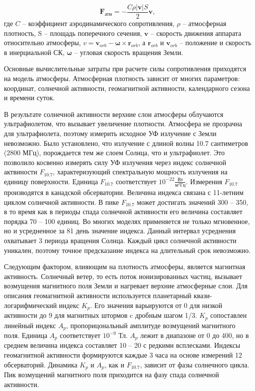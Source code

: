 \begin{equation*}
    \mathbf{F}_{\text{атм}} = - \frac{C \rho |\mathbf{v}| S}{2} \mathbf{v},
\end{equation*}
где $C$ -- коэффициент аэродинамического сопротивления, $\rho$ -- атмосферная плотность, 
S -- площадь поперечного сечения, 
$\mathbf{v}$ -- скорость движения аппарата относительно атмосферы, 
$v = \mathbf{v}_{orb} - \mathbf{\omega} \times \mathbf{r}_{orb}$, а
$\mathbf{r}_{orb}$ и $\mathbf{v}_{orb}$  -- положение и скорость в инерциальной СК,
$\mathbf{\omega}$ -- угловая скорость вращения Земли.

Основные вычислительные затраты при расчете силы сопротивления приходятся на модель атмосферы.
Атмосферная плотность зависит от многих параметров: координат, солнечной активности,
геомагнитной активности, календарного сезона и времени суток.

В результате солнечной активности верхние слои атмосферы облучаются ультрафиолетом,
что вызывает увеличение плотности. Атмосфера не прозрачна для ультрафиолета,
поэтому измерить исходное УФ излучение с Земли невозможно. Было установлено, что
излучение с длиной волны 10.7 сантиметров (2800 МГц), порождается тем же слоем Солнца, что и
ультрафиолет. Это позволило косвенно измерять силу УФ излучения через индекс
солнечной актвиности $F_{10.7}$, характеризующий спектральную мощность излучения на единицу поверхности. Единица $F_{10.7}$ соответствует
$10^{-22} \frac{\text{Вт}}{\text{м}^2 \text{Гц}}$. 
Измерения $F_{10.7}$ производятся в канадской обсерватории. 
Величина индекса связана с 11-летним циклом солнечной активности. 
В пике $F_{10.7}$ может достигать значений 300 -- 350, в то время как в периоды спада
солнечной активности его величина составляет порядка 70 -- 100 единиц. 
Во многих моделях применяется не только мгновенное, но и усредненное за 81 день значение индекса.
Данный интервал усреднения охватывает 3 периода вращения Солнца. 
Каждый цикл солнечной активности уникален, 
поэтому точное предсказание индекса на длительный срок невозможно.

Следующим фактором, влияющим на плотность атмосферы, является магнитная активность.
Солнечный ветер, то есть поток ионизированных частиц, 
вызывает возмущения магнитного поля Земли и нагревает верхние атмосферные слои.
Для описания геомагнитной активности используется планетарный квази-логарифмический индекс $K_p$.
Его значения варьируются от 0 для низкой активности до 9 для магнитных штормов c дробным шагом 1/3. 
$K_p$ сопоставлен линейный индекс $A_p$, пропорицональный амплитуде возмущений магнитного поля.
Единица $A_p$ соответствует $10^{-9}$ Тл. $A_p$ лежит в диапазоне от 0 до 400, но в среднем величина индекса составляет 10 -- 20 с редкими всплесками.
Индексы геомагнитной активности формируются каждые 3 часа на основе измерений 12 обсерваторий.
Динамика $K_p$ и $A_p$, как и $F_{10.7}$, зависит от фазы солнечного цикла.
Пик возмущений магнитного поля приходится на фазу спада солнечной активности.

